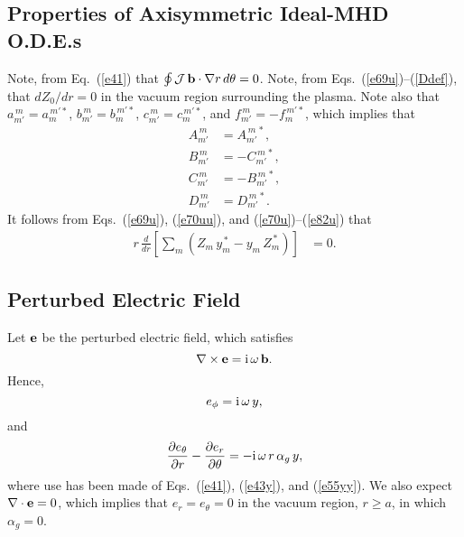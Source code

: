 \documentclass[12pt,prb,aps,notitlepage]{revtex4-1}
\begin{document}
\subsection{Properties of Axisymmetric Ideal-MHD O.D.E.s}
Note, from Eq.~(\ref{e41}) that $\oint {\cal J}\,{\bf b}\cdot\nabla r \,d\theta=0$. 
Note, from Eqs.~(\ref{e69u})--(\ref{Ddef}),  that $dZ_0/dr=0$ in the vacuum region surrounding the plasma. 
Note also  that
$a_{m'}^{\,m} =a_{m}^{\,m'\ast}$, 
$b_{m'}^{\,m} =b_{m}^{\,m'\ast}$, 
$c_{m'}^{\,m} =c_{m}^{\,m'\ast}$, and 
$f_{m'}^{\,m} =-f_{m}^{\,m'\ast}$,
which implies that
\begin{align}\label{e70u}
A_{m'}^{\,m} &= A_{m'}^{\,m\,\ast},\\[0.5ex]
B_{m'}^{\,m} &= -C_{m'}^{\,m\,\ast},\\[0.5ex]
C_{m'}^{\,m} &= -B_{m'}^{\,m\,\ast},\\[0.5ex]
D_{m'}^{\,m} &= D_{m'}^{\,m\,\ast}.\label{e82u}
\end{align}
It follows from Eqs.~(\ref{e69u}), (\ref{e70uu}), and (\ref{e70u})--(\ref{e82u}) that 
\begin{align}
r\,\frac{d}{dr}\!\left[\sum_m (Z_m\,y_m^{\,\ast}- y_m\,Z_m^{\,\ast}) \right]&= 0.
\end{align}

\subsection{Perturbed Electric Field}
Let ${\bf e}$ be the perturbed electric field, which satisfies 
\begin{equation}
\nabla\times {\bf e} = {\rm i}\,\omega\,{\bf b}.
\end{equation}
Hence,
\begin{equation}\label{ephi}
e_\phi = {\rm i}\,\omega\,y,
\end{equation}
and 
\begin{equation}\label{e81op}
\frac{\partial e_\theta}{\partial r} - \frac{\partial e_r}{\partial\theta} = - {\rm i}\,\omega\,r\,\alpha_g\,y,
\end{equation}
where use has been made of Eqs.~(\ref{e41}), (\ref{e43y}), and (\ref{e55yy}).
We also expect $\nabla\cdot{\bf e} =0$, which implies that 
$e_r=e_\theta=0$ in the vacuum region, $r\geq a$, in which $\alpha_g=0$. 
\end{document}
